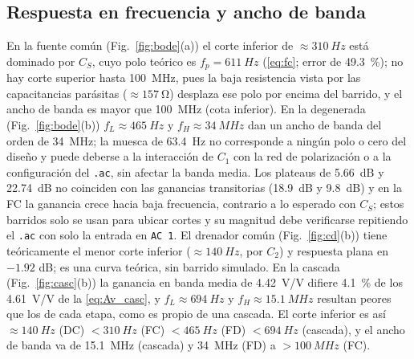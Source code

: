 \documentclass[conference]{IEEEtran}
\begin{document}
\subsection{Respuesta en frecuencia y ancho de banda}
\label{sec:an_bode}
En la fuente común (Fig.~\ref{fig:bode}(a)) el corte inferior de $\approx\SI{310}{Hz}$ está dominado por $C_S$, cuyo polo teórico es $f_p=\SI{611}{Hz}$ (\eqref{eq:fc}; error de \SI{49.3}{\percent}); no hay corte superior hasta \SI{100}{MHz}, pues la baja resistencia vista por las capacitancias parásitas ($\approx\SI{157}{\ohm}$) desplaza ese polo por encima del barrido, y el ancho de banda es mayor que \SI{100}{MHz} (cota inferior). En la degenerada (Fig.~\ref{fig:bode}(b)) $f_L\approx\SI{465}{Hz}$ y $f_H\approx\SI{34}{MHz}$ dan un ancho de banda del orden de \SI{34}{MHz}; la muesca de \SI{63.4}{Hz} no corresponde a ningún polo o cero del diseño y puede deberse a la interacción de $C_1$ con la red de polarización o a la configuración del \texttt{.ac}, sin afectar la banda media. Los plateaus de \SI{5.66}{dB} y \SI{22.74}{dB} no coinciden con las ganancias transitorias (\SI{18.9}{dB} y \SI{9.8}{dB}) y en la FC la ganancia crece hacia baja frecuencia, contrario a lo esperado con $C_S$; estos barridos solo se usan para ubicar cortes y su magnitud debe verificarse repitiendo el \texttt{.ac} con solo la entrada en \texttt{AC 1}. El drenador común (Fig.~\ref{fig:cd}(b)) tiene teóricamente el menor corte inferior ($\approx\SI{140}{Hz}$, por $C_2$) y respuesta plana en $-1.92$ dB; es una curva teórica, sin barrido simulado. En la cascada (Fig.~\ref{fig:casc}(b)) la ganancia en banda media de \SI{4.42}{V/V} difiere \SI{4.1}{\percent} de los \SI{4.61}{V/V} de la \eqref{eq:Av_casc}, y $f_L\approx\SI{694}{Hz}$ y $f_H\approx\SI{15.1}{MHz}$ resultan peores que los de cada etapa, como es propio de una cascada. El corte inferior es así $\approx\SI{140}{Hz}$ (DC) $<\SI{310}{Hz}$ (FC) $<\SI{465}{Hz}$ (FD) $<\SI{694}{Hz}$ (cascada), y el ancho de banda va de \SI{15.1}{MHz} (cascada) y \SI{34}{MHz} (FD) a $>\SI{100}{MHz}$ (FC).

\end{document}
